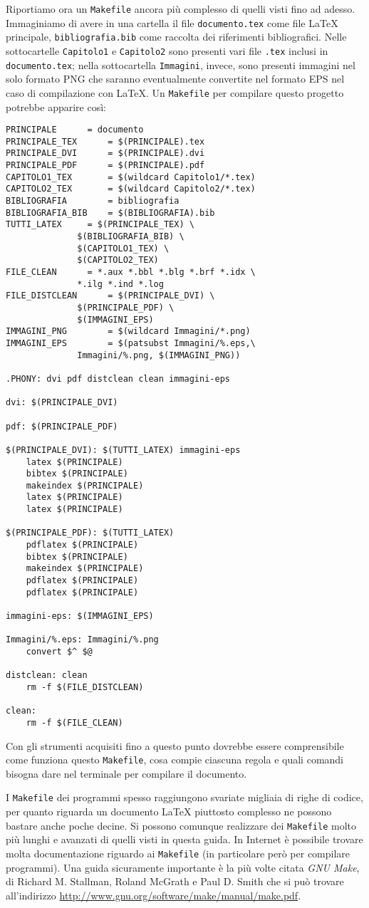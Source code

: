 Riportiamo ora un \verb|Makefile| ancora più complesso di quelli visti fino ad
adesso. Immaginiamo di avere in una cartella il file \verb|documento.tex| come
file \LaTeX{}
principale, \verb|bibliografia.bib| come raccolta dei riferimenti bibliografici.
Nelle sottocartelle \verb|Capitolo1| e \verb|Capitolo2| sono presenti vari file
\verb|.tex| inclusi in \verb|documento.tex|; nella sottocartella
\verb|Immagini|, invece, sono presenti immagini nel solo formato \textsc{PNG}
che saranno eventualmente convertite nel formato \textsc{EPS} nel caso di
compilazione con \LaTeX.  Un \verb|Makefile| per compilare questo progetto
potrebbe apparire così:
\begin{lstlisting}
PRINCIPALE 		= documento
PRINCIPALE_TEX		= $(PRINCIPALE).tex
PRINCIPALE_DVI		= $(PRINCIPALE).dvi
PRINCIPALE_PDF		= $(PRINCIPALE).pdf
CAPITOLO1_TEX		= $(wildcard Capitolo1/*.tex)
CAPITOLO2_TEX		= $(wildcard Capitolo2/*.tex)
BIBLIOGRAFIA		= bibliografia
BIBLIOGRAFIA_BIB	= $(BIBLIOGRAFIA).bib
TUTTI_LATEX		= $(PRINCIPALE_TEX) \
			  $(BIBLIOGRAFIA_BIB) \
			  $(CAPITOLO1_TEX) \
			  $(CAPITOLO2_TEX)
FILE_CLEAN		= *.aux *.bbl *.blg *.brf *.idx \
			  *.ilg *.ind *.log
FILE_DISTCLEAN		= $(PRINCIPALE_DVI) \
			  $(PRINCIPALE_PDF) \
			  $(IMMAGINI_EPS)
IMMAGINI_PNG		= $(wildcard Immagini/*.png)
IMMAGINI_EPS		= $(patsubst Immagini/%.eps,\
			  Immagini/%.png, $(IMMAGINI_PNG))

.PHONY: dvi pdf distclean clean immagini-eps

dvi: $(PRINCIPALE_DVI)

pdf: $(PRINCIPALE_PDF)

$(PRINCIPALE_DVI): $(TUTTI_LATEX) immagini-eps
	latex $(PRINCIPALE)
	bibtex $(PRINCIPALE)
	makeindex $(PRINCIPALE)
	latex $(PRINCIPALE)
	latex $(PRINCIPALE)

$(PRINCIPALE_PDF): $(TUTTI_LATEX)
	pdflatex $(PRINCIPALE)
	bibtex $(PRINCIPALE)
	makeindex $(PRINCIPALE)
	pdflatex $(PRINCIPALE)
	pdflatex $(PRINCIPALE)

immagini-eps: $(IMMAGINI_EPS)

Immagini/%.eps: Immagini/%.png
	convert $^ $@

distclean: clean
	rm -f $(FILE_DISTCLEAN)

clean:
	rm -f $(FILE_CLEAN)
\end{lstlisting}
Con gli strumenti acquisiti fino a questo punto dovrebbe essere comprensibile
come funziona questo \verb|Makefile|, cosa compie ciascuna regola e quali
comandi bisogna dare nel terminale per compilare il documento.

I \verb|Makefile| dei programmi spesso raggiungono svariate migliaia di righe di
codice, per quanto riguarda un documento \LaTeX{}
piuttosto complesso ne possono bastare anche poche decine.  Si possono comunque
realizzare dei \verb|Makefile| molto più lunghi e avanzati di quelli visti in
questa guida.  In Internet è possibile trovare molta documentazione riguardo ai
\verb|Makefile| (in particolare però per compilare programmi).  Una guida
sicuramente importante è la più volte citata \emph{GNU Make}, di Richard
M. Stallman, Roland McGrath e Paul D. Smith che si può trovare all'indirizzo
\url{http://www.gnu.org/software/make/manual/make.pdf}.

